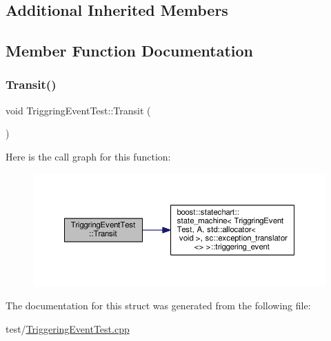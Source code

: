 \subsection*{Additional Inherited Members}


\subsection{Member Function Documentation}
\mbox{\label{struct_triggring_event_test_aa24d7f5136f07fac2ed5678f205c9a89}} 
\subsubsection{\texorpdfstring{Transit()}{Transit()}}
{\footnotesize\ttfamily void Triggring\+Event\+Test\+::\+Transit (\begin{DoxyParamCaption}\item[{const \mbox{\hyperlink{struct_ev_go_to_b}{Ev\+Go\+ToB}} \&}]{ }\end{DoxyParamCaption})\hspace{0.3cm}{\ttfamily [inline]}}

Here is the call graph for this function\+:
\nopagebreak
\begin{figure}[H]
\begin{center}
\leavevmode
\includegraphics[width=350pt]{struct_triggring_event_test_aa24d7f5136f07fac2ed5678f205c9a89_cgraph}
\end{center}
\end{figure}


The documentation for this struct was generated from the following file\+:\begin{DoxyCompactItemize}
\item 
test/\mbox{\hyperlink{_triggering_event_test_8cpp}{Triggering\+Event\+Test.\+cpp}}\end{DoxyCompactItemize}
